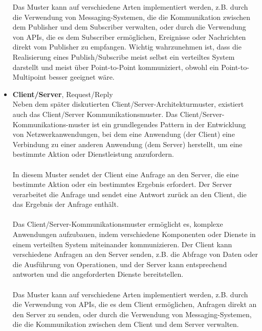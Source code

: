 \documentclass[../vs-script-first-v01.tex]{subfiles}
\begin{document}
\begin{itemize}
Das Muster kann auf verschiedene Arten implementiert werden, z.B. durch die Verwendung von Messaging-Systemen, die die Kommunikation zwischen dem Publisher und dem Subscriber verwalten, oder durch die Verwendung von APIs, die es dem Subscriber ermöglichen, Ereignisse oder Nachrichten direkt vom Publisher zu empfangen.
Wichtig wahrzunehmen ist, dass die Realisierung eines Publish/Subscribe meist selbst ein verteiltes System darstellt und meist über Point-to-Point kommuniziert, obwohl ein Point-to-Multipoint besser geeignet wäre.
\item \textbf{Client/Server}, Request/Reply\\
Neben dem später diskutierten Client/Server-Architekturmuster, existiert auch das Client/Server Kommunikationsmuster. Das Client/Server-Kommunikations-muster ist ein grundlegendes Pattern in der Entwicklung von Netzwerkanwendungen, bei dem eine Anwendung (der Client) eine Verbindung zu einer anderen Anwendung (dem Server) herstellt, um eine bestimmte Aktion oder Dienstleistung anzufordern.
\\\\
In diesem Muster sendet der Client eine Anfrage an den Server, die eine bestimmte Aktion oder ein bestimmtes Ergebnis erfordert. Der Server verarbeitet die Anfrage und sendet eine Antwort zurück an den Client, die das Ergebnis der Anfrage enthält.
\\\\
Das Client/Server-Kommunikationsmuster ermöglicht es, komplexe Anwendungen aufzubauen, indem verschiedene Komponenten oder Dienste in einem verteilten System miteinander kommunizieren. Der Client kann verschiedene Anfragen an den Server senden, z.B. die Abfrage von Daten oder die Ausführung von Operationen, und der Server kann entsprechend antworten und die angeforderten Dienste bereitstellen.
\\\\
Das Muster kann auf verschiedene Arten implementiert werden, z.B. durch die Verwendung von APIs, die es dem Client ermöglichen, Anfragen direkt an den Server zu senden, oder durch die Verwendung von Messaging-Systemen, die die Kommunikation zwischen dem Client und dem Server verwalten.

\end{itemize}
\end{document}
